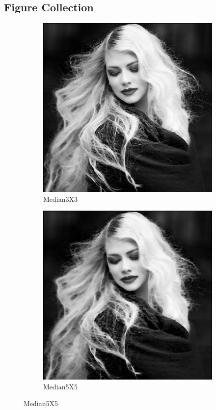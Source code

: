 \documentclass[14pt]{article}
\begin{document}
	\subsection{Figure Collection }
	\newpage
	\begin{figure}[hbt!]
		\centering
	\begin{subfigure}[b]{0.4\linewidth}
		\includegraphics[width=\linewidth]{m3.png}
		\caption{Median3X3}
	\end{subfigure}
	\begin{subfigure}[b]{0.4\linewidth}
		\includegraphics[width=\linewidth]{m5.png}
		\caption{Median5X5}
	\end{subfigure}
	\end{figure}
\end{document}
